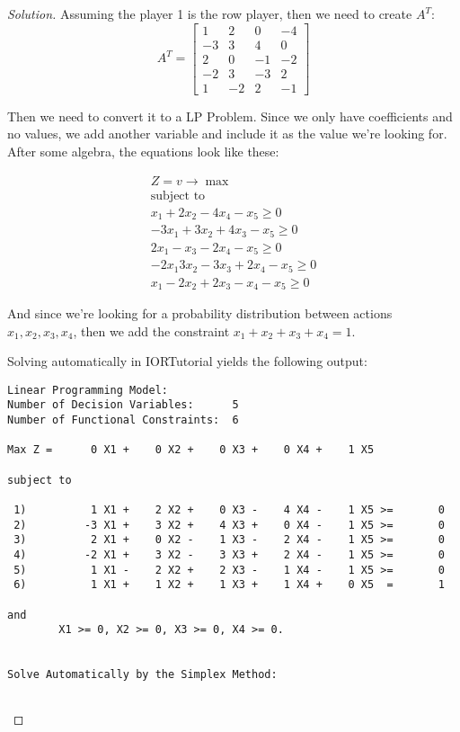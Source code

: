 \documentclass[titlepage, letterpaper, fleqn]{article}
\renewcommand\qedsymbol{\(\blacksquare\)}
\newenvironment{solution}
{\renewcommand\qedsymbol{$\square$}\begin{proof}[Solution]}
{\end{proof}}
\begin{document}
\begin{solution}
Assuming the player 1 is the row player, then we need to create $A^T$:
$$
A^T =
\begin{bmatrix}
1 & 2 & 0 & -4 \\
-3 & 3 & 4 & 0 \\
2 & 0 & -1 & -2 \\
-2 & 3 & -3 & 2 \\
1 & -2 & 2 & -1
\end{bmatrix}
$$

Then we need to convert it to a LP Problem.
Since we only have coefficients and no values,
we add another variable and include it as the value we're looking for.
After some algebra, the equations look like these:

\begin{align*}
	Z = v \to \max \\
	\text{subject to} \\
	x_1 + 2x_2 -4x_4 - x_5 \geq 0 \\
	-3x_1 + 3x_2 + 4x_3 - x_5 \geq 0 \\
	2x_1 -x_3 -2x_4 - x_5 \geq 0 \\
	-2x_1 3x_2 -3x_3 + 2x_4 - x_5 \geq 0 \\
	x_1 -2x_2 + 2x_3 -x_4 -x_5 \geq 0
\end{align*}

And since we're looking for a probability distribution between actions $x_1, x_2, x_3, x_4$, then we add the constraint $x_1 + x_2 + x_3 + x_4 = 1$.

Solving automatically in IORTutorial yields the following output:
\begin{lstlisting}[basicstyle=\tiny]
Linear Programming Model:
Number of Decision Variables:      5
Number of Functional Constraints:  6

Max Z =      0 X1 +    0 X2 +    0 X3 +    0 X4 +    1 X5 

subject to

 1)          1 X1 +    2 X2 +    0 X3 -    4 X4 -    1 X5 >=       0
 2)         -3 X1 +    3 X2 +    4 X3 +    0 X4 -    1 X5 >=       0
 3)          2 X1 +    0 X2 -    1 X3 -    2 X4 -    1 X5 >=       0
 4)         -2 X1 +    3 X2 -    3 X3 +    2 X4 -    1 X5 >=       0
 5)          1 X1 -    2 X2 +    2 X3 -    1 X4 -    1 X5 >=       0
 6)          1 X1 +    1 X2 +    1 X3 +    1 X4 +    0 X5  =       1

and
        X1 >= 0, X2 >= 0, X3 >= 0, X4 >= 0.


Solve Automatically by the Simplex Method:


\end{lstlisting}
\end{solution}
\end{document}

